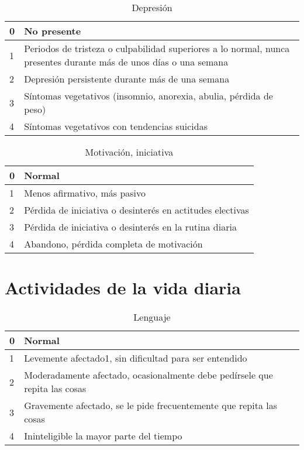 \begin{table}[H]
\begin{center}
\begin{tabular}{|p{1cm}|p{11cm}|}
\hline
0 & No presente \\\hline
1 & Periodos de tristeza o culpabilidad superiores a lo normal, nunca presentes durante más de unos días o una semana \\\hline
2 & Depresión persistente durante más de una semana \\\hline
3 & Síntomas vegetativos (insomnio, anorexia, abulia, pérdida de peso) \\\hline
4 & Síntomas vegetativos con tendencias suicidas\\\hline
\end{tabular}
\caption{Depresión}
\end{center}
\end{table}

\begin{table}[H]
\begin{center}
\begin{tabular}{|p{1cm}|p{11cm}|}
\hline
0 & Normal \\\hline
1 & Menos afirmativo, más pasivo \\\hline
2 & Pérdida de iniciativa o desinterés en actitudes electivas \\\hline
3 & Pérdida de iniciativa o desinterés en la rutina diaria \\\hline
4 & Abandono, pérdida completa de motivación\\\hline
\end{tabular}
\caption{Motivación, iniciativa}
\end{center}
\end{table}

\section{Actividades de la vida diaria} 

\begin{table}[H]
\begin{center}
\begin{tabular}{|p{1cm}|p{11cm}|}
\hline
0 & Normal \\\hline
1 & Levemente afectado1, sin dificultad para ser entendido \\\hline
2 & Moderadamente afectado, ocasionalmente debe pedírsele que repita las cosas \\\hline
3 & Gravemente afectado, se le pide frecuentemente que repita las cosas \\\hline
4 & Ininteligible la mayor parte del tiempo\\\hline
\end{tabular}
\caption{Lenguaje}
\end{center}
\end{table}


